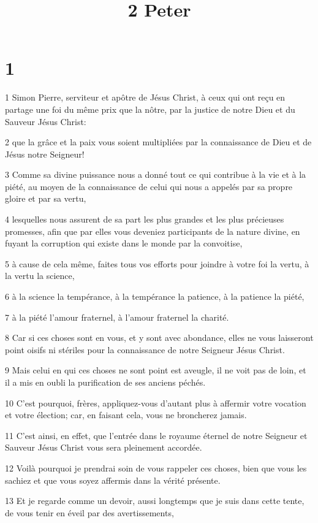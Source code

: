 

\title{2 Peter}


\chapter{1}

\par 1 Simon Pierre, serviteur et apôtre de Jésus Christ, à ceux qui ont reçu en partage une foi du même prix que la nôtre, par la justice de notre Dieu et du Sauveur Jésus Christ:
\par 2 que la grâce et la paix vous soient multipliées par la connaissance de Dieu et de Jésus notre Seigneur!
\par 3 Comme sa divine puissance nous a donné tout ce qui contribue à la vie et à la piété, au moyen de la connaissance de celui qui nous a appelés par sa propre gloire et par sa vertu,
\par 4 lesquelles nous assurent de sa part les plus grandes et les plus précieuses promesses, afin que par elles vous deveniez participants de la nature divine, en fuyant la corruption qui existe dans le monde par la convoitise,
\par 5 à cause de cela même, faites tous vos efforts pour joindre à votre foi la vertu, à la vertu la science,
\par 6 à la science la tempérance, à la tempérance la patience, à la patience la piété,
\par 7 à la piété l'amour fraternel, à l'amour fraternel la charité.
\par 8 Car si ces choses sont en vous, et y sont avec abondance, elles ne vous laisseront point oisifs ni stériles pour la connaissance de notre Seigneur Jésus Christ.
\par 9 Mais celui en qui ces choses ne sont point est aveugle, il ne voit pas de loin, et il a mis en oubli la purification de ses anciens péchés.
\par 10 C'est pourquoi, frères, appliquez-vous d'autant plus à affermir votre vocation et votre élection; car, en faisant cela, vous ne broncherez jamais.
\par 11 C'est ainsi, en effet, que l'entrée dans le royaume éternel de notre Seigneur et Sauveur Jésus Christ vous sera pleinement accordée.
\par 12 Voilà pourquoi je prendrai soin de vous rappeler ces choses, bien que vous les sachiez et que vous soyez affermis dans la vérité présente.
\par 13 Et je regarde comme un devoir, aussi longtemps que je suis dans cette tente, de vous tenir en éveil par des avertissements,
